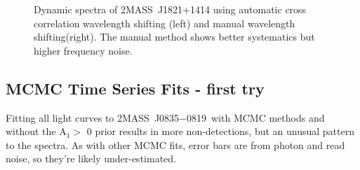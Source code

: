 \documentclass[manuscript]{aastex6}
\newcommand{\sha}{2MASS~J0835$-$0819}
\newcommand{\shb}{2MASS~J1821+1414}
\begin{document}
\begin{figure}[!t]
\centering
{}
	\caption{Dynamic spectra of {\shb} using automatic cross correlation wavelength shifting (left) and manual wavelength shifting(right).
	The manual method shows better systematics but higher frequency noise.}
	\label{fig:manualVsAutoShift1821}
	\vspace{0.1in}
\end{figure} 

\clearpage
\pagebreak
\subsection{MCMC Time Series Fits - first try}

Fitting all light curves to \sha\ with MCMC methods and without the A$_1 >$ 0 prior results in more non-detections, but an unusual pattern to the spectra.
As with other MCMC fits, error bars are from photon and read noise, so they're likely under-estimated.
\end{document}
